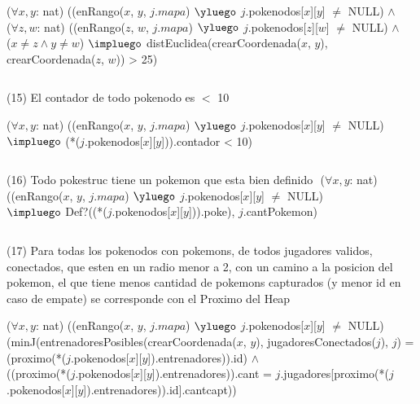 \begin{Representacion}
($\forall x, y$: nat) ((enRango($x$, $y$, $j.mapa$) $\yluego$ $j$.pokenodos[$x$][$y$] $\neq$ NULL) $ \land$\\
($\forall z, w$: nat) ((enRango($z$, $w$, $j.mapa$) $\yluego$ $j$.pokenodos[$z$][$w$] $\neq$ NULL) $\land$ \\
($x \neq z \land y \neq w$) $\impluego$  distEuclidea(crearCoordenada($x$, $y$), crearCoordenada($z$, $w$)) > 25)

$ $\newline

(15) El contador de todo pokenodo es $<$ 10 $ $\newline

($\forall x, y$: nat) ((enRango($x$, $y$, $j.mapa$) $\yluego$ $j$.pokenodos[$x$][$y$] $\neq$ NULL) \\
  $\impluego$ (*($j$.pokenodos[$x$][$y$])).contador < 10)

$ $\newline

(16) Todo pokestruc tiene un pokemon que esta bien definido $ $\newline
($\forall x, y$: nat) ((enRango($x$, $y$, $j.mapa$) $\yluego$ $j$.pokenodos[$x$][$y$] $\neq$ NULL) \\
  $\impluego$ Def?((*($j$.pokenodos[$x$][$y$])).poke), $j$.cantPokemon)

$ $\newline


(17) Para todas los pokenodos con pokemons, de todos jugadores validos, conectados, que esten en un radio menor a 2, con un camino a la posicion del pokemon, el que tiene menos cantidad de pokemons capturados (y menor id en caso de empate) se corresponde con el Proximo del Heap $ $\newline

($\forall x, y$: nat) ((enRango($x$, $y$, $j.mapa$) $\yluego$ $j$.pokenodos[$x$][$y$] $\neq$ NULL) \\
  (minJ(entrenadoresPosibles(crearCoordenada($x$, $y$), jugadoresConectados($j$), $j$) = \\
  (proximo(*($j$.pokenodos[$x$][$y$]).entrenadores)).id) $\land$ \\
  ((proximo(*($j$.pokenodos[$x$][$y$]).entrenadores)).cant = $j$.jugadores[proximo(*($j$.pokenodos[$x$][$y$]).entrenadores)).id].cantcapt))
  

\end{Representacion}

